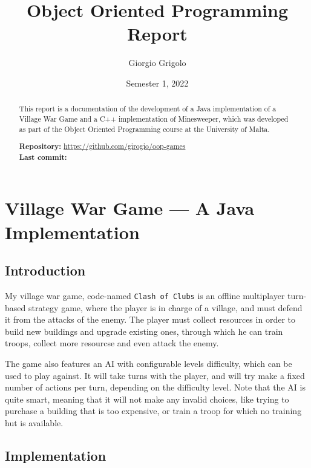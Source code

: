 \documentclass{article}
\title{Object Oriented Programming Report}
\author{Giorgio Grigolo}
\date{Semester 1, 2022}
\newcommand{\code}[1]{\texttt{#1}}
\begin{document}
\maketitle
\begin{abstract}
    \begin{center}
        This report is a documentation of the development of a Java implementation of a Village War Game and a C++ implementation of Minesweeper, 
        which was developed as part of the Object Oriented Programming course at the University of Malta.
    \end{center}

    \begin{center}
        \textbf{Repository: }\href{https://github.com/girogio/oop-games}{https://github.com/girogio/oop-games}\\
        \textbf{Last commit: } 
    \end{center}
\end{abstract}

\tableofcontents

\newpage

\section{Village War Game --- A Java Implementation}

\subsection{Introduction}

My village war game, code-named \code{Clash of Clubs} is an offline multiplayer turn-based strategy game,
where the player is in charge of a village, and must defend it from the attacks of 
the enemy. The player must collect resources in order to build new buildings and upgrade existing ones, through which he can train troops,
collect more resourcse and even attack the enemy.

The game also features an AI with configurable levels difficulty, which can be used to play against.
It will take turns with the player, and will try make a fixed number of actions per turn, 
depending on the difficulty level. Note that the AI is quite smart, meaning that it will not make any invalid choices,
like trying to purchase a building that is too expensive, or train a troop for which no training hut is available.

\subsection{Implementation}
\end{document}
